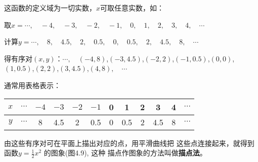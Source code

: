 \begin{solution}
这函数的定义域为一切实数，$x$可取任意实数，如：

取$x=\cdots,\quad -4,\quad -3,\quad -2,\quad -1,\quad 0,\quad 1,\quad 2,\quad 3,\quad 4,\quad \cdots$

计算$y=\cdots,\quad 8,\quad 4.5,\quad 2,\quad 0.5,\quad 0,\quad 0.5,\quad 2,\quad 4.5,\quad 8,\quad \cdots$

得有序对$(x,y)$：$\cdots,\quad (-4,8)$,\quad  $(-3,4.5)$,\quad  $(-2,2)$,\quad  $(-1,0.5)$,\quad  $(0,0)$,\quad  $(1,0.5)$,\quad  $(2,2)$,\quad  $(3,4.5)$,\quad  $(4,8),\quad\cdots$


通常用表格表示：
\begin{center}
\begin{tabular}{c|ccccccccccc}
\hline
$x$ & $\cdots$  &  $-4$  &  $-3$  &  $-2 $ &  $-1$  &  0  &  1  &  2  &  3  &  4  &  $\cdots$\\
\hline
$y$ &$\cdots$  &  8  &  4.5  &  2  &  0.5  &  0  &  0.5  &  2  &  4.5  &  8  &  $\cdots$\\
\hline
\end{tabular}
\end{center}

由这些有序对可在平面上描出对应的点，用平滑曲线把
这些点连接起来，就得到函数$y=\frac{1}{2}x^2$
的图象(图4.9), 这种
描点作图象的方法叫做\textbf{描点法}。
\begin{figure}[htp]
    \centering
{}
    \caption{}
\end{figure}
\end{solution}

